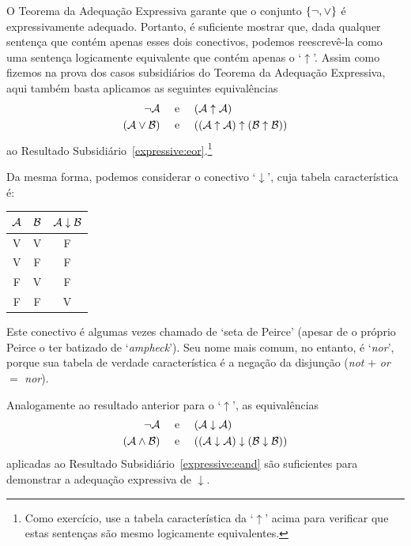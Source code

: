 O Teorema da Adequação Expressiva garante que o conjunto $\{\neg, \vee\}$ é expressivamente adequado.
Portanto, é suficiente mostrar que, dada qualquer sentença que contém apenas esses dois conectivos, podemos reescrevê-la como uma sentença logicamente equivalente que contém apenas o `$\uparrow$'.
Assim como fizemos na prova dos casos subsidiários do Teorema da Adequação Expressiva, aqui também basta aplicamos as seguintes equivalências
		\begin{align*}
			\neg \mathcal{A} &\text{\quad \ e \quad} (\mathcal{A} \uparrow \mathcal{A})\\
			(\mathcal{A} \vee \mathcal{B}) & \text{\quad \ e \quad} ((\mathcal{A} \uparrow \mathcal{A}) \uparrow (\mathcal{B} \uparrow \mathcal{B}))
		\end{align*}
ao Resultado Subsidiário~\ref{expressive:eor}.\footnote{Como exercício, use a tabela característica da `$\uparrow$' acima para verificar que estas sentenças são mesmo logicamente equivalentes.}

Da mesma forma, podemos considerar o conectivo `$\downarrow$', cuja tabela característica é:
\begin{center}
\begin{tabular}{c c | c}
$\mathcal{A}$ & $\mathcal{B}$ & $\mathcal{A} \mathrel{\downarrow} \mathcal{B}$\\
\hline
 V & V & F \\
 V & F & F  \\
 F & V & F  \\
 F & F & V
\end{tabular}
\end{center}
Este conectivo é algumas vezes chamado de `seta de Peirce' (apesar de o próprio Peirce o ter batizado de `\emph{ampheck}').
Seu nome mais comum, no entanto, é `\emph{nor}', porque sua tabela de verdade característica é a negação da disjunção (\emph{not} $+$ \emph{or} $=$ \emph{nor}).

Analogamente ao resultado anterior para o `$\uparrow$', as equivalências
		\begin{align*}
			\neg \mathcal{A} &\text{\quad \ e \quad} (\mathcal{A} \downarrow \mathcal{A})\\
			(\mathcal{A} \wedge \mathcal{B}) & \text{\quad \ e \quad} ((\mathcal{A} \downarrow \mathcal{A}) \downarrow (\mathcal{B} \downarrow \mathcal{B}))
		\end{align*}
aplicadas ao Resultado Subsidiário~\ref{expressive:eand} são suficientes para demonstrar a adequação expressiva de $\downarrow$.


